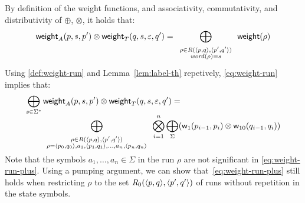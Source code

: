 By definition of the weight functions, and 
associativity, commutativity, and distributivity of $\oplus$, $\otimes$,  
it holds that:
\begin{equation}\label{eq:weight-run}
\weight_A(p, s, p') \otimes \weight_T(q, s, \varepsilon, q') = 
\bigoplus_{\begin{array}{c}
		   \scriptstyle\rho \in \Rho(\< p, q>, \< p', q'>)\\[-1ex]
		   \scriptstyle\word(\rho) = s
		   \end{array}} 
\weight(\rho) 
\end{equation}
%
Using \eqref{def:weight-run} 
and Lemma~\ref{lem:label-th} repetively, 
\eqref{eq:weight-run} implies that:
%
\begin{equation}\label{eq:weight-run-plus}
\begin{array}{l}
\displaystyle\bigoplus_{s \in \Sigma^*} 
  \weight_A(p, s, p') \otimes \weight_T(q, s, \varepsilon, q') =\\
\multicolumn{1}{r}{%
\qquad
\displaystyle\bigoplus_{\begin{array}{c}
		   \scriptstyle\rho \in \Rho(\< p, q>, \< p', q'>)\\[-1ex]
		   \scriptstyle\rho = \< p_0, q_0>, a_1,\< p_1, q_1>,\ldots, a_n, \< p_n, q_n>\\[-1ex]
		   \end{array}} 
\displaystyle\bigotimes_{i = 1}^{n} 
\displaystyle\bigoplus_\Sigma (\wei_1(p_{i-1}, p_i) \otimes
                  \wei_{10}(q_{i-1}, q_i))
}
\end{array}           %
\end{equation}
%
Note that the symbols $a_1, \ldots, a_n \in \Sigma$ in the run $\rho$
are not significant in \eqref{eq:weight-run-plus}.
%
Using a pumping argument, we can show that~\eqref{eq:weight-run-plus}
still holds when restricting $\rho$ to the set $\Rho_0(\< p, q>, \< p', q'>)$
of runs without repetition in the state symbols.

